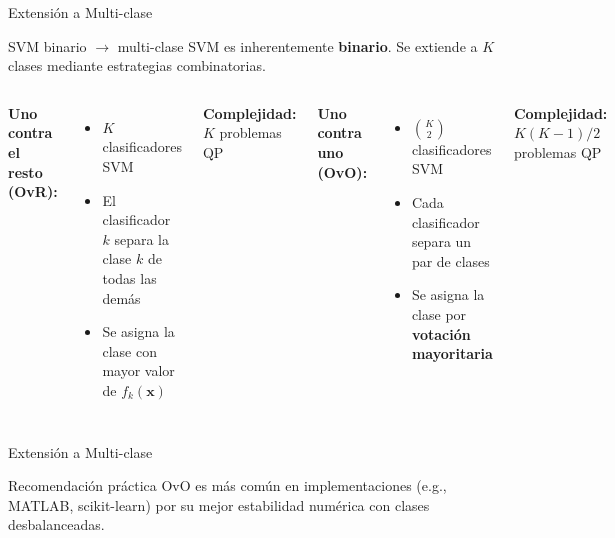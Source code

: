 \documentclass[aspectratio=169,xcolor=dvipsnames]{beamer}
\begin{document}
\begin{frame}{Extensión a Multi-clase}
    \begin{block}{SVM binario $\rightarrow$ multi-clase}
        SVM es inherentemente \textbf{binario}. Se extiende a $K$ clases mediante estrategias combinatorias.
    \end{block}

    \vspace{0.3em}
    \begin{columns}
        \textbf{Uno contra el resto (OvR):}
        \begin{itemize}
            \item $K$ clasificadores SVM
            \item El clasificador $k$ separa la clase $k$ de todas las demás
            \item Se asigna la clase con mayor valor de $f_k(\mathbf{x})$
        \end{itemize}
        \vspace{0.3em}
        \textbf{Complejidad:} $K$ problemas QP

        \textbf{Uno contra uno (OvO):}
        \begin{itemize}
            \item $\binom{K}{2}$ clasificadores SVM
            \item Cada clasificador separa un par de clases
            \item Se asigna la clase por \textbf{votación mayoritaria}
        \end{itemize}
        \vspace{0.3em}
        \textbf{Complejidad:} $K(K-1)/2$ problemas QP
    \end{columns}
\end{frame}
\begin{frame}{Extensión a Multi-clase}

    \vspace{0.3em}
    \begin{exampleblock}{Recomendación práctica}
        OvO es más común en implementaciones (e.g., MATLAB, scikit-learn) por su mejor estabilidad numérica con clases desbalanceadas.
    \end{exampleblock}
\end{frame}
\end{document}
